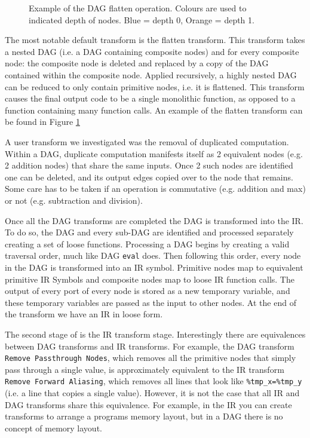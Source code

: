 \begin{figure}[h!]
    \centering
    \hspace{1em}
    \hspace{1em}
    \caption{Example of the DAG flatten operation. Colours are used to indicated depth of nodes. Blue = depth 0, Orange = depth 1.}\label{fig:flatten_example}
\end{figure}

The most notable default transform is the flatten transform.
This transform takes a nested DAG (i.e. a DAG containing composite nodes) and for every composite node: the composite node is deleted and replaced by a copy of the DAG contained within the composite node.
Applied recursively, a highly nested DAG can be reduced to only contain primitive nodes, i.e. it is flattened.
This transform causes the final output code to be a single monolithic function, as opposed to a function containing many function calls.
An example of the flatten transform can be found in Figure \ref{fig:flatten_example}

A user transform we investigated was the removal of duplicated computation.
Within a DAG, duplicate computation manifests itself as 2 equivalent nodes (e.g. 2 addition nodes) that share the same inputs.
Once 2 such nodes are identified one can be deleted, and its output edges copied over to the node that remains.
Some care has to be taken if an operation is commutative (e.g. addition and max) or not (e.g. subtraction and division).

Once all the DAG transforms are completed the DAG is transformed into the IR.
To do so, the DAG and every sub-DAG are identified and processed separately creating a set of loose functions.
Processing a DAG begins by creating a valid traversal order, much like DAG \texttt{eval} does.
Then following this order, every node in the DAG is transformed into an IR symbol.
Primitive nodes map to equivalent primitive IR Symbols and composite nodes map to loose IR function calls.
The output of every port of every node is stored as a new temporary variable, and these temporary variables are passed as the input to other nodes.
At the end of the transform we have an IR in loose form.

The second stage of \phlat is the IR transform stage.
Interestingly there are equivalences between DAG transforms and IR transforms.
For example, the DAG transform \texttt{Remove Passthrough Nodes}, which removes all the primitive nodes that simply pass through a single value, is approximately equivalent to the IR transform \texttt{Remove Forward Aliasing}, which removes all lines that look like \lstinline{%tmp_x=%tmp_y} (i.e. a line that copies a single value).
However, it is not the case that all IR and DAG transforms share this equivalence.
For example, in the IR you can create transforms to arrange a programs memory layout, but in a DAG there is no concept of memory layout.

